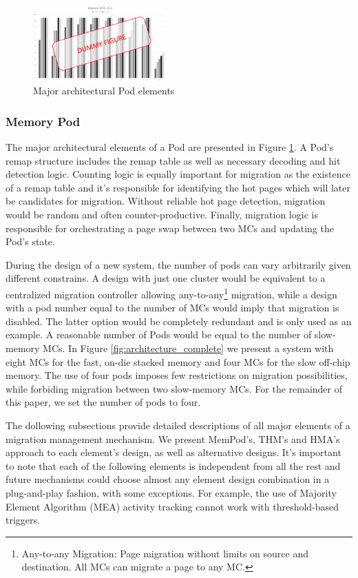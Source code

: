 \begin{figure}[h]
  \includegraphics[width=0.46\textwidth]{figures/dummy.pdf}
  \caption{Major architectural Pod elements}
  \label{fig:architecture_pod}
\end{figure}

\subsubsection*{Memory Pod}
The major architectural elements of a Pod are presented in Figure \ref{fig:architecture_pod}. A Pod's remap structure includes the remap table as well as necessary decoding and hit detection logic. Counting logic is equally important for migration as the existence of a remap table and it's responsible for identifying the hot pages which will later be candidates for migration. Without reliable hot page detection, migration would be random and often counter-productive. Finally, migration logic is responsible for orchestrating a page swap between two MCs and updating the Pod's state.

During the design of a new system, the number of pods can vary arbitrarily given different constrains. A design with just one cluster would be equivalent to a centralized migration controller allowing any-to-any\footnote{Any-to-any Migration: Page migration without limits on source and destination. All MCs can migrate a page to any MC.} migration, while a design with a pod number equal to the number of MCs would imply that migration is disabled. The latter option would be completely redundant and is only used as an example. A reasonable number of Pods would be equal to the number of slow-memory MCs. In Figure \ref{fig:architecture_complete} we present a system with eight MCs for the fast, on-die stacked memory and four MCs for the slow off-chip memory. The use of four pods imposes few restrictions on migration possibilities, while forbiding migration between two slow-memory MCs. For the remainder of this paper, we set the number of pods to four.

The dollowing subsections provide detailed descriptions of all major elements of a migration management mechanism. We present MemPod's, THM's and HMA's approach to each element's design, as well as alternative designs. It's important to note that each of the following elements is independent from all the rest and future mechanisms could choose almost any element design combination in a plug-and-play fashion, with some exceptions. For example, the use of Majority Element Algorithm (MEA) activity tracking cannot work with threshold-based triggers.

